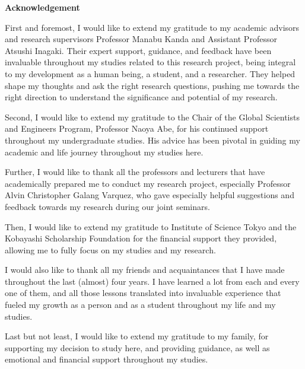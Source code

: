 \begin{center}
    \textbf{\Huge Acknowledgement} \\
    \vspace{0.4cm}
\end{center}

First and foremost, I would like to extend my gratitude to my academic advisors and research supervisors Professor Manabu Kanda and Assistant Professor Atsushi Inagaki. Their expert support, guidance, and feedback have been invaluable throughout my studies related to this research project, being integral to my development as a human being, a student, and a researcher. They helped shape my thoughts and ask the right research questions, pushing me towards the right direction to understand the significance and potential of my research.

Second, I would like to extend my gratitude to the Chair of the Global Scientists and Engineers Program, Professor Naoya Abe, for his continued support throughout my undergraduate studies. His advice has been pivotal in guiding my academic and life journey throughout my studies here. 

Further, I would like to thank all the professors and lecturers that have academically prepared me to conduct my research project, especially Professor Alvin Christopher Galang Varquez, who gave especially helpful suggestions and feedback towards my research during our joint seminars.

Then, I would like to extend my gratitude to Institute of Science Tokyo and the Kobayashi Scholarship Foundation for the financial support they provided, allowing me to fully focus on my studies and my research.

I would also like to thank all my friends and acquaintances that I have made throughout the last (almost) four years. I have learned a lot from each and every one of them, and all those lessons translated into invaluable experience that fueled my growth as a person and as a student throughout my life and my studies.

Last but not least, I would like to extend my gratitude to my family, for supporting my decision to study here, and providing guidance, as well as emotional and financial support throughout my studies. 

\newpage